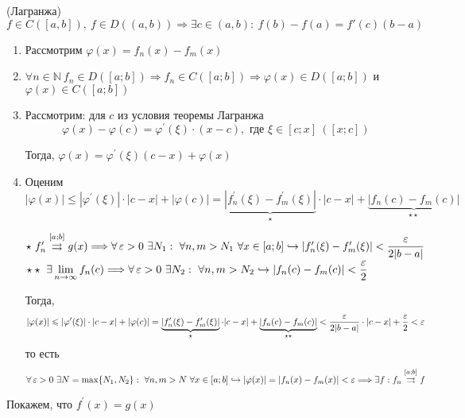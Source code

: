 \documentclass[a4paper]{article}
\begin{document}
\theorem (Лагранжа) $f\in C([a,b]),\ f\in D((a, b))\Longrightarrow\exists c\in(a,b):\ f(b)-f(a)=f'(c)(b-a)$
\begin{enumerate}
    \item Рассмотрим $\varphi(x)=f_n(x)-f_m(x)$
    \item $\forall n\in\mathbb{N}\ f_n\in D([a;b])\Longrightarrow f_n\in C([a;b])\Longrightarrow \varphi(x)\in D([a;b])$ и $\varphi(x)\in C([a;b])$
    \item Рассмотрим: для $c$ из условия теоремы Лагранжа $$\varphi(x)-\varphi(c)=\varphi^{\prime}(\xi)\cdot(x-c),\text{ где }\xi\in[c;x]\ ([x;c])$$
    
    Тогда, $\varphi(x)=\varphi^{\prime}(\xi)(c-x)+\varphi(x)$ %
    \item Оценим $|\varphi(x)|\leqslant |\varphi^{\prime}(\xi)|\cdot|c-x|+|\varphi(c)|=\underbrace{|f^{\prime}_n(\xi)-f^{\prime}_m(\xi)|}_{\star}\cdot|c-x|+\underbrace{|f_n(c)-f_m(c)|}_{\star\star}$
    
    $\star\ f^{\prime}_n\overset{[a;b]}{\rightrightarrows}g(x)\Longrightarrow\forall\ve>0\ \exists N_1:\ \forall n,m>N_1\ \forall x\in[a;b]\hookrightarrow|f^{\prime}_n(\xi)-f^{\prime}_m(\xi)|<\displaystyle\frac{\ve}{2|b-a|}$\\
    $\star\star\ \exists\lim\limits_{n\to\infty}f_n(c)\Longrightarrow\forall\ve>0\ \exists N_2:\ \forall n,m>N_2\hookrightarrow|f_n(c)-f_m(c)|<\displaystyle\frac{\ve}{2}$

    Тогда,
    \begin{equation*}
        |\varphi(x)|\leqslant |\varphi^{\prime}(\xi)|\cdot|c-x|+|\varphi(c)|=\underbrace{|f^{\prime}_n(\xi)-f^{\prime}_m(\xi)|}_{\star}\cdot|c-x|+\underbrace{|f_n(c)-f_m(c)|}_{\star\star}<\frac{\operatorname{\varepsilon}}{2|b-a|}\cdot|c-x|+\frac{\operatorname{\varepsilon}}{2}<\operatorname{\varepsilon}
    \end{equation*}
    то есть
    \begin{equation*}
        \forall\operatorname{\varepsilon}>0\ \exists N=\max\{N_1,N_2\}:\ \forall n,m >N\ \forall x\in[a;b]\hookrightarrow|\varphi(x)|=|f_n(x)-f_m(x)|<\operatorname{\varepsilon}\Longrightarrow\exists f: f_n\overset{[a;b]}{\rightrightarrows}f
    \end{equation*}
\end{enumerate}

\proof Покажем, что $f^{\prime}(x)=g(x)$
\end{document}
